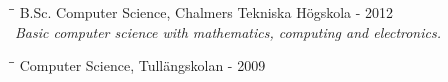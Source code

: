 \documentclass[11pt]{res}
\begin{document}
\begin{resume}
\vspace{-45pt}

	\begin{tabbing}
		\hspace{2.3in}\= \hspace{2.6in}\= \kill 
	 	B.Sc. Computer Science, Chalmers Tekniska Högskola \>  - 2012 \\
		\textit{Basic computer science with mathematics, computing and electronics. } \\
		\textit{}
	\end{tabbing}

\vspace{-45pt}

       \begin{tabbing}
       		\hspace{2.3in}\= \hspace{2.6in}\= \kill
   		Computer Science, Tullängskolan \>  - 2009 
       \end{tabbing}


\end{resume}
\end{document}
